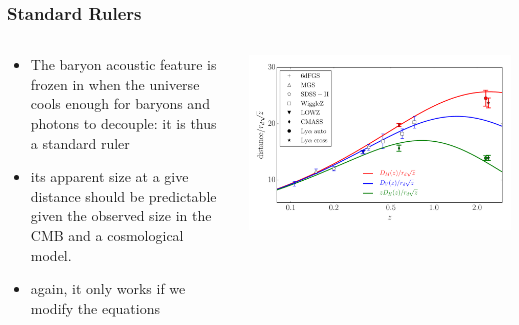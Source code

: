 \documentclass{beamer}
\begin{document}
\frame
{
    \frametitle{Standard Rulers}

    \fontsize{9}{0.8\baselineskip}
    \begin{columns}
        \begin{column}{0.5\textwidth}    
            \begin{itemize}

                \item The baryon acoustic feature is frozen in when the
                    universe cools enough for baryons and photons to decouple:
                    it is thus a standard ruler

                \item its apparent size at a give distance should be predictable
                    given the observed size in the CMB and a cosmological model.

                \item again, it only works if we modify the equations

            \end{itemize}
        \end{column}
        \begin{column}{0.5\textwidth}
            \includegraphics[width=\textwidth]{bao-all.pdf}
        \end{column}
    \end{columns}
}
\end{document}
